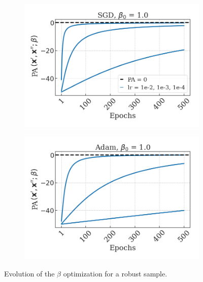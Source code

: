 \begin{figure}[H]
    \centering
    \begin{subfigure}[b]{0.45\textwidth}
        \centering
        \includegraphics[width=\textwidth]{img/results_discussion/empirical/rob_met=logPA_hue=lr_opt=sgd_beta0=1.0.png}
    \end{subfigure}
    \hfill
    \begin{subfigure}[b]{0.45\textwidth}
        \centering
        \includegraphics[width=\textwidth]{img/results_discussion/empirical/rob_met=logPA_hue=lr_opt=adam_beta0=1.0.png}
    \end{subfigure}
    \caption{Evolution of the $\beta$ optimization for a robust sample.}
\end{figure}

